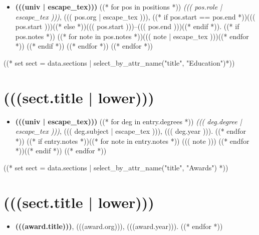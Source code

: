 \documentclass[10pt,oneside]{article}
\begin{document}
\mbox{}\vspace{-\dimexpr\baselineskip\relax}

\begin{itemize}[label={}]
  ((* for univ, positions in sect.entries.items() *))
  \item \textbf{(((univ | escape_tex)))}
        ((* for pos in positions *))
        \textit{((( pos.role | escape_tex )))}, ((( pos.org | escape_tex ))), ((* if pos.start == pos.end *))((( pos.start )))((* else *))((( pos.start )))--((( pos.end )))((* endif *)).
        ((* if pos.notes *))
        ((* for note in pos.notes *))((( note | escape_tex )))((* endfor *))
        ((* endif *))
        ((* endfor *))
        ((* endfor *))
\end{itemize}

((* set sect = data.sections | select_by_attr_name("title", "Education")*))
\section{\color{BrickRed}(((sect.title | lower)))}

\mbox{}\vspace{-\dimexpr\baselineskip\relax}

\begin{itemize}[label={}]
  ((* for univ, entry in sect.entries.items() *))
  \item \textbf{(((univ | escape_tex)))}
        ((* for deg in entry.degrees *))
        \textit{((( deg.degree | escape_tex )))}, ((( deg.subject | escape_tex ))), ((( deg.year ))).
        ((* endfor *))
        ((* if entry.notes *))((* for note in entry.notes *))
        ((( note )))
        ((* endfor *))((* endif *))
        ((* endfor *))
\end{itemize}

((* set sect = data.sections | select_by_attr_name("title", "Awards") *))
\section{\color{BrickRed}(((sect.title | lower)))}

\mbox{}\vspace{-\dimexpr\baselineskip\relax}

\begin{itemize}[label={}]
  ((* for award in sect.entries.awards | sort_by_attr(["year"], reverse=True) *))
  \item \textbf{(((award.title)))}, (((award.org))), (((award.year))).
        ((* endfor *))
\end{itemize}
\end{document}
